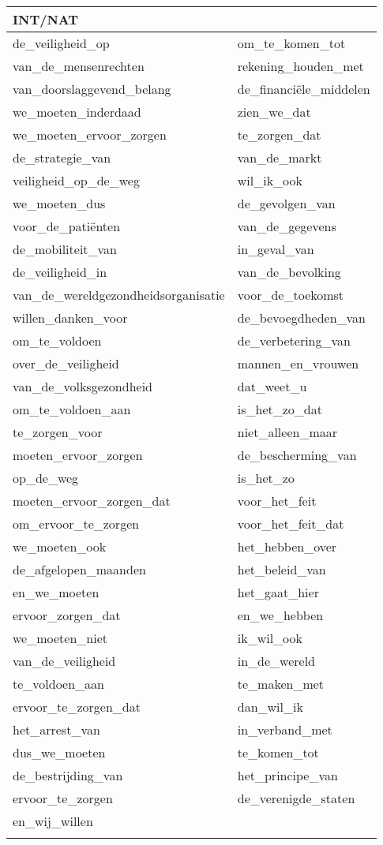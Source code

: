 \documentclass[output=paper]{langscibook}
\begin{document}
\begin{table}[H]
\begin{tabularx}{\textwidth}{ll}
\lsptoprule
{\bfseries INT/NAT} & \\
\midrule
de\_veiligheid\_op & om\_te\_komen\_tot\\
van\_de\_mensenrechten & rekening\_houden\_met\\
van\_doorslaggevend\_belang & de\_financiële\_middelen\\
we\_moeten\_inderdaad & zien\_we\_dat\\
we\_moeten\_ervoor\_zorgen & te\_zorgen\_dat\\
de\_strategie\_van & van\_de\_markt\\
veiligheid\_op\_de\_weg & wil\_ik\_ook\\
we\_moeten\_dus & de\_gevolgen\_van\\
voor\_de\_patiënten & van\_de\_gegevens\\
de\_mobiliteit\_van & in\_geval\_van\\
de\_veiligheid\_in & van\_de\_bevolking\\
van\_de\_wereldgezondheidsorganisatie & voor\_de\_toekomst\\
willen\_danken\_voor & de\_bevoegdheden\_van\\
om\_te\_voldoen & de\_verbetering\_van\\
over\_de\_veiligheid & mannen\_en\_vrouwen\\
van\_de\_volksgezondheid & dat\_weet\_u\\
om\_te\_voldoen\_aan & is\_het\_zo\_dat\\
te\_zorgen\_voor & niet\_alleen\_maar\\
moeten\_ervoor\_zorgen & de\_bescherming\_van\\
op\_de\_weg & is\_het\_zo\\
moeten\_ervoor\_zorgen\_dat & voor\_het\_feit\\
om\_ervoor\_te\_zorgen & voor\_het\_feit\_dat\\
we\_moeten\_ook & het\_hebben\_over\\
de\_afgelopen\_maanden & het\_beleid\_van\\
en\_we\_moeten & het\_gaat\_hier\\
ervoor\_zorgen\_dat & en\_we\_hebben\\
we\_moeten\_niet & ik\_wil\_ook\\
van\_de\_veiligheid & in\_de\_wereld\\
te\_voldoen\_aan & te\_maken\_met\\
ervoor\_te\_zorgen\_dat & dan\_wil\_ik\\
het\_arrest\_van & in\_verband\_met\\
dus\_we\_moeten & te\_komen\_tot\\
de\_bestrijding\_van & het\_principe\_van\\
ervoor\_te\_zorgen & de\_verenigde\_staten\\
en\_wij\_willen & \\
\lspbottomrule
\end{tabularx}\vspace*{-1cm}
\end{table}

\clearpage
\sloppy\printbibliography[heading=subbibliography,notkeyword=this]
\end{document}
